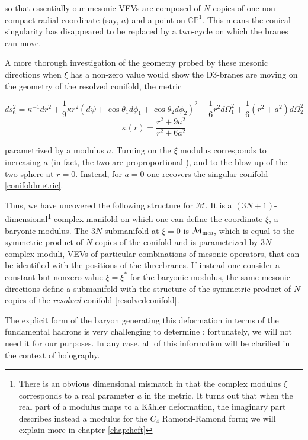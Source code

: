 so that essentially our mesonic VEVs are composed of $N$ copies of one non-compact radial coordinate (say, $a$) and a point on $\mathbb{CP}^1$. This means the conical singularity has disappeared to be replaced by a two-cycle on which the branes can move.

A more thorough investigation of the geometry probed by these mesonic directions when $\xi$ has a non-zero value would show the D3-branes are moving on the geometry of the resolved conifold, the metric \cite{PandoZayas}

\begin{equation}
	ds_6^2 = \kappa^{-1} dr^2 + \frac{1}{9} \kappa r^2 (d\psi + \cos\theta_1 d\phi_1 + \cos\theta_2 d\phi_2)^2 + \frac{1}{6} r^2 d\Omega_1^2 + \frac{1}{6} (r^2 + a^2 ) d\Omega_2^2\label{resolvedconifold}
\end{equation}
\begin{equation}
	\kappa(r) = \frac{r^2 + 9a^2}{r^2 + 6a^2}
	\label{}
\end{equation}

parametrized by a modulus $a$. Turning on the $\xi$ modulus corresponds to increasing $a$ (in fact, the two are proproportional \cite{MZ}), and to the blow up of the two-sphere at $r=0$. Instead, for $a=0$ one recovers the singular conifold \eqref{conifoldmetric}.

Thus, we have uncovered the following structure for $\mathcal{M}$. It is a $(3N + 1)$-dimensional\footnote{There is an obvious dimensional mismatch in that the complex modulus $\xi$ corresponds to a real parameter $a$ in the metric. It turns out that when the real part of a modulus maps to a K\"ahler deformation, the imaginary part describes instead a modulus for the $C_4$ Ramond-Ramond form; we will explain more in chapter \ref{chap:heft}} complex manifold on which one can define the coordinate $\xi$, a baryonic modulus. The $3N$-submanifold at $\xi = 0$ is $\mathcal{M}_\mathrm{mes}$, which is equal to the symmetric product of $N$ copies of the conifold and is parametrized by $3N$ complex moduli, VEVs of particular combinations of mesonic operators, that can be identified with the positions of the threebranes. If instead one consider a constant but nonzero value $\xi = \xi^*$ for the baryonic modulus, the same mesonic directions define a submanifold with the structure of the symmetric product of $N$ copies of the \emph{resolved} conifold \eqref{resolvedconifold}.

The explicit form of the baryon generating this deformation in terms of the fundamental hadrons is very challenging to determine \cite{Forcella}; fortunately, we will not need it for our purposes. In any case, all of this information will be clarified in the context of holography.



